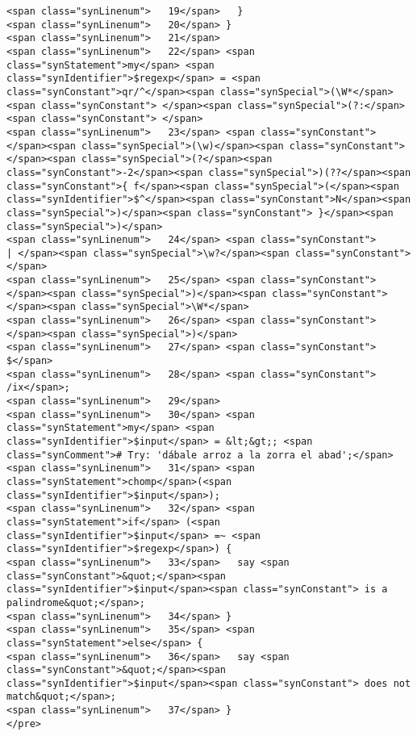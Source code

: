 \begin{verbatim}
<span class="synLinenum">   19</span>   }
<span class="synLinenum">   20</span> }
<span class="synLinenum">   21</span> 
<span class="synLinenum">   22</span> <span class="synStatement">my</span> <span class="synIdentifier">$regexp</span> = <span class="synConstant">qr/^</span><span class="synSpecial">(\W*</span><span class="synConstant"> </span><span class="synSpecial">(?:</span><span class="synConstant"> </span>
<span class="synLinenum">   23</span> <span class="synConstant">                            </span><span class="synSpecial">(\w)</span><span class="synConstant"> </span><span class="synSpecial">(?</span><span class="synConstant">-2</span><span class="synSpecial">)(??</span><span class="synConstant">{ f</span><span class="synSpecial">(</span><span class="synIdentifier">$^</span><span class="synConstant">N</span><span class="synSpecial">)</span><span class="synConstant"> }</span><span class="synSpecial">)</span>
<span class="synLinenum">   24</span> <span class="synConstant">                          | </span><span class="synSpecial">\w?</span><span class="synConstant"> </span>
<span class="synLinenum">   25</span> <span class="synConstant">                      </span><span class="synSpecial">)</span><span class="synConstant"> </span><span class="synSpecial">\W*</span>
<span class="synLinenum">   26</span> <span class="synConstant">                  </span><span class="synSpecial">)</span>
<span class="synLinenum">   27</span> <span class="synConstant">                $</span>
<span class="synLinenum">   28</span> <span class="synConstant">               /ix</span>;
<span class="synLinenum">   29</span> 
<span class="synLinenum">   30</span> <span class="synStatement">my</span> <span class="synIdentifier">$input</span> = &lt;&gt;; <span class="synComment"># Try: 'dábale arroz a la zorra el abad';</span>
<span class="synLinenum">   31</span> <span class="synStatement">chomp</span>(<span class="synIdentifier">$input</span>);
<span class="synLinenum">   32</span> <span class="synStatement">if</span> (<span class="synIdentifier">$input</span> =~ <span class="synIdentifier">$regexp</span>) {
<span class="synLinenum">   33</span>   say <span class="synConstant">&quot;</span><span class="synIdentifier">$input</span><span class="synConstant"> is a palindrome&quot;</span>;
<span class="synLinenum">   34</span> }
<span class="synLinenum">   35</span> <span class="synStatement">else</span> {
<span class="synLinenum">   36</span>   say <span class="synConstant">&quot;</span><span class="synIdentifier">$input</span><span class="synConstant"> does not match&quot;</span>;
<span class="synLinenum">   37</span> }
</pre>

\end{verbatim}

